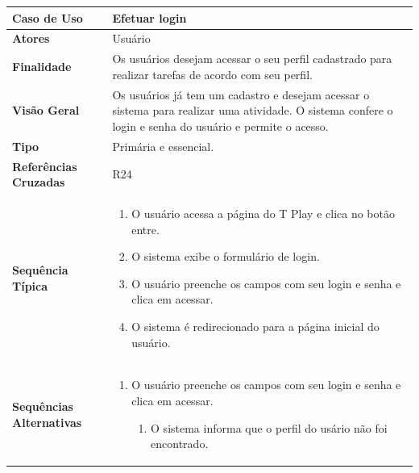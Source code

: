 \documentclass[a4paper,11pt]{article}
\begin{document}
\begin{table}[H]
		\begin{tabularx}{\textwidth}{|l|X|}
		\hline
			\textbf{Caso de Uso} &  Efetuar login \\ \hline
			\textbf{Atores} &  Usuário  \\ \hline
			\textbf{Finalidade} & Os usuários desejam acessar o seu perfil cadastrado para realizar tarefas de acordo com seu perfil.  \\ \hline
			\textbf{Visão Geral} & Os usuários já tem um cadastro e desejam acessar o sistema para realizar uma atividade. O sistema confere o login e senha do usuário e permite o acesso. \\ \hline
			\textbf{Tipo} &  Primária e essencial. \\ \hline
			\textbf{Referências Cruzadas} & R24 \\ \hline
			\textbf{Sequência Típica} & 
			\begin{enumerate}
			\item O usuário acessa a página do T Play e clica no botão entre.
			\item O sistema exibe o formulário de login.
			\item O usuário preenche os campos com seu login e senha e clica em acessar.
			\item O sistema é redirecionado para a página inicial do usuário.
			\end{enumerate} \\ \hline
			\textbf{Sequências Alternativas} & 
			\begin{enumerate}
			\item O usuário preenche os campos com seu login e senha e clica em acessar.
			\begin{enumerate}
			\item O sistema informa que o perfil do usário não foi encontrado.
			\end{enumerate}
			\end{enumerate} \\ \hline
		\end{tabularx}
\end{table}
\end{document}

